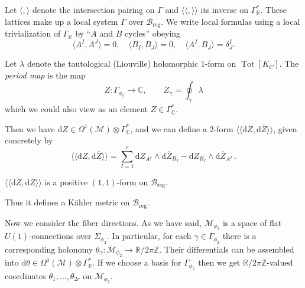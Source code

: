 \documentclass[12pt,letterpaper,reqno]{article}
\numberwithin{equation}{section}
\begin{document}
Let $\langle , \rangle$ denote the intersection pairing on $\Gamma$
and $\langle\!\langle , \rangle\!\rangle$ its inverse on $\Gamma^*_\mathbb R$.
These lattices make up a local system $\Gamma$ over $\mathcal B_\mathrm{reg}$.
We write local formulas using a local
trivialization of $\Gamma_\mathbb R$ by ``$A$ and $B$ cycles''
obeying
\begin{equation}
  \langle A^I, A^J \rangle=0, \quad \langle B_I, B_J \rangle=0, \quad \langle A^I,B_J \rangle = \delta^I_J.
\end{equation}

\begin{defn}
Let $\lambda$ denote the tautological (Liouville) holomorphic $1$-form
on $\operatorname{Tot}[K_C]$.
The \textit{period map} is the map
\begin{equation}
   Z: \Gamma_{\phi_2} \to \mathbb C, \qquad Z_\gamma = \oint_\gamma \lambda
\end{equation}
which we could also view as an element $Z \in \Gamma^*_\mathbb C$.
\end{defn}
Then we have $\mathrm{d} Z \in \Omega^1(\mathcal M) \otimes \Gamma_\mathbb C^*$,
and we can define a $2$-form $\langle\!\langle \mathrm{d} Z, \mathrm{d} \overline{Z} \rangle\!\rangle$,
given concretely by
\begin{equation}
  \langle\!\langle \mathrm{d} Z, \mathrm{d} \overline{Z} \rangle\!\rangle = \sum_{I = 1}^{r} \mathrm{d} Z_{A^I} \wedge \mathrm{d} \overline{Z}_{B_I} - \mathrm{d} Z_{B_I} \wedge \mathrm{d} \overline{Z}_{A^I} \, .
\end{equation}

\begin{prop}[Positivity] 
$\langle\!\langle \mathrm{d} Z, \mathrm{d} \overline{Z} \rangle\!\rangle$ is a positive $(1,1)$-form on $\mathcal B_\mathrm{reg}$. 
\end{prop}
Thus it defines
a K\"ahler metric on $\mathcal B_\mathrm{reg}$.

Now we consider the fiber directions.
As we have said, $\mathcal M_{\phi_2}$ is a space of flat $U(1)$-connections
over $\Sigma_{\phi_2}$. 
In particular, for each $\gamma \in \Gamma_{\phi_2}$ 
there is a corresponding
holonomy $\theta_\gamma: \mathcal M_{\phi_2} \to \mathbb R / 2 \pi \mathbb Z$.
Their differentials can be assembled into
  $\mathrm{d} \theta \in \Omega^1(\mathcal M) \otimes \Gamma^*_\mathbb R$.
If we choose a basis for $\Gamma_{\phi_2}$ 
then we get $\mathbb R / 2 \pi \mathbb Z$-valued coordinates $\theta_1, \dots, \theta_{2r}$
on $\mathcal M_{\phi_2}$.
\end{document}
